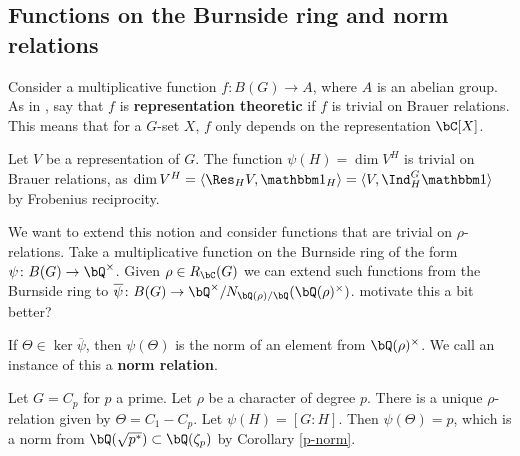\subsection{Functions on the Burnside ring and norm relations}

Consider a multiplicative function $f \colon B(G) \to A$, where $A$ is an abelian group. As in \cite{reg-const}, say that $f$ is \textbf{representation theoretic} if $f$ is trivial on Brauer relations. This means that for a $G$-set $X$, $f$ only depends on the representation $\bC[X]$. 

\begin{example}
  Let $V$ be a representation of $G$. The function $\psi(H) = \dim V^H$ is trivial on Brauer relations, as $\dim V^H = \langle \Res_{H} V , \trivial_H \rangle = \langle V, \Ind_{H}^G \trivial \rangle$ by Frobenius reciprocity.
\end{example}

We want to extend this notion and consider functions that are trivial on $\rho$-relations.
Take a multiplicative function on the Burnside ring of the form $\psi \colon B(G) \to \bQ^{\times}$. Given $\rho \in R_{\bC}(G)$ we can extend such functions from the Burnside ring to $\overline{\psi} \colon B(G) \to \bQ^{\times} / N_{\bQ(\rho) / \bQ}(\bQ(\rho)^\times)$. {\color{red} motivate this a bit better?}

\begin{defn}
If $\Theta \in \ker \overline{\psi}$, then $\psi(\Theta)$ is the norm of an element from $\bQ(\rho)^{\times}$. We call an instance of this a \textbf{norm relation}.
\end{defn}



\begin{example}
    Let $G = C_p$ for $p$ a prime. Let $\rho$ be a character of degree $p$. There is a unique $\rho$-relation given by $\Theta = C_1 - C_p$. Let $\psi(H) = [G \colon H]$. Then $\psi(\Theta) = p$, which is a norm from $\bQ(\sqrt{p^*}) \subset \bQ(\zeta_p)$ by Corollary \ref{p-norm}. 
\end{example}

